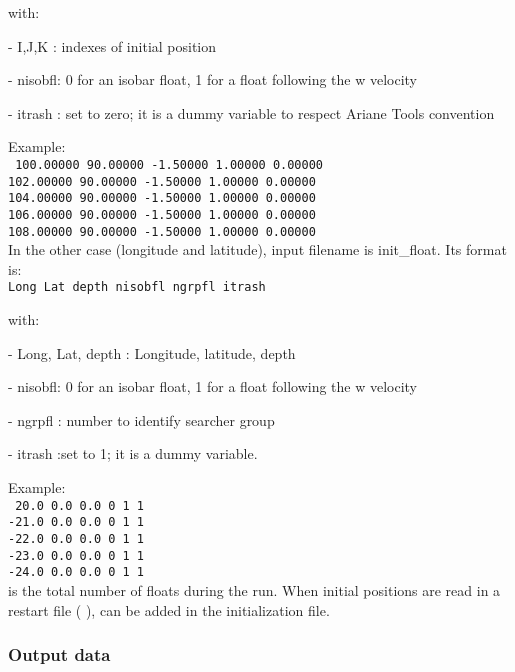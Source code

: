 \documentclass[../main/NEMO_manual]{subfiles}
\begin{document}
\noindent with:

 - I,J,K  : indexes of initial position

 - nisobfl: 0 for an isobar float, 1 for a float following the w velocity

 - itrash : set to zero; it is a dummy variable to respect Ariane Tools convention

\noindent Example: \\
\noindent
{
  \texttt{
    100.00000  90.00000  -1.50000 1.00000   0.00000   \\
    102.00000  90.00000  -1.50000 1.00000   0.00000   \\
    104.00000  90.00000  -1.50000 1.00000   0.00000   \\
    106.00000  90.00000  -1.50000 1.00000   0.00000   \\
    108.00000  90.00000  -1.50000 1.00000   0.00000}
} \\

In the other case (longitude and latitude), input filename is init\_float.
Its format is: \\
{ \texttt{Long Lat depth nisobfl ngrpfl itrash}}

\noindent with:

 - Long, Lat, depth  : Longitude, latitude, depth

 - nisobfl: 0 for an isobar float, 1 for a float following the w velocity

 - ngrpfl : number to identify searcher group

 - itrash :set to 1; it is a dummy variable.

\noindent Example: \\
\noindent
{
  \texttt{
    20.0 0.0 0.0 0 1 1    \\
    -21.0 0.0 0.0 0 1 1    \\
    -22.0 0.0 0.0 0 1 1    \\
    -23.0 0.0 0.0 0 1 1    \\
    -24.0 0.0 0.0 0 1 1 }
} \\

 is the total number of floats during the run.
When initial positions are read in a restart file ( ),
 can be added in the initialization file.

\subsubsection{Output data}
\end{document}
